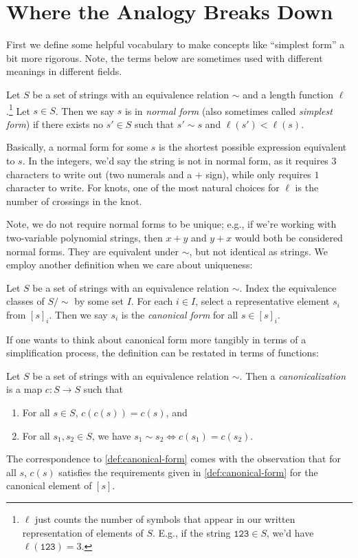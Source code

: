 \section{Where the Analogy Breaks Down}\label{sec:analogy-breakdown}
First we define some helpful vocabulary to make concepts like
``simplest form'' a bit more rigorous. Note, the terms below are
sometimes used with different meanings in different fields.
\begin{definition}\label{def:normal-form}
  Let $S$ be a set of strings with an equivalence relation $\sim$ and
  a length function $\ell$.\footnote{$\ell$ just counts the number of
    symbols that appear in our written representation of elements of
    $S$. E.g., if the string $\texttt{123}\in S$, we'd have
    $\ell(\texttt{123}) = 3$.} Let $s \in S$. Then we say $s$ is in
  \emph{normal form} (also sometimes called \emph{simplest form}) if
  there exists no $s' \in S$ such that $s' \sim s$ and $\ell(s') <
  \ell(s)$.
\end{definition}
Basically, a normal form for some $s$ is the shortest possible
expression equivalent to $s$. In the integers, we'd say the string
 is not in normal form, as it requires $3$ characters to
write out (two numerals and a $+$ sign), while  only requires
$1$ character to write. For knots, one of the most natural choices for
$\ell$ is the number of crossings in the knot.

Note, we do not require normal forms to be unique; e.g., if we're
working with two-variable polynomial strings, then $x+y$ and $y+x$
would both be considered normal forms. They are equivalent under
$\sim$, but not identical as strings. We employ another definition
when we care about uniqueness: %
\begin{definition}\label{def:canonical-form}
  Let $S$ be a set of strings with an equivalence relation $\sim$.
  Index the equivalence classes of $S/\sim$ by some set $I$. For each
  $i \in I$, select a representative element $s_i$ from $[s]_i$. Then
  we say $s_i$ is the \emph{canonical form} for all $s \in [s]_i$.
\end{definition}
If one wants to think about canonical form more tangibly in terms of a
simplification process, the definition can be restated in terms of
functions:
\begin{definition}[Canonicalization]\label{def:canonicalization}
  Let $S$ be a set of strings with an equivalence relation $\sim$.
  Then a \emph{canonicalization} is a map $c : S \to S$ such that
  \begin{enumerate}
    \item For all $s \in S$, $c(c(s)) = c(s)$, and
    \item For all $s_1, s_2 \in S$, we have $s_1 \sim s_2 \iff c(s_1)
      = c(s_2)$.\qedhere
  \end{enumerate}
\end{definition}
The correspondence to \cref{def:canonical-form} comes with the
observation that for all $s$, $c(s)$ satisfies the requirements given
in \cref{def:canonical-form} for the canonical element of $[s]$.

